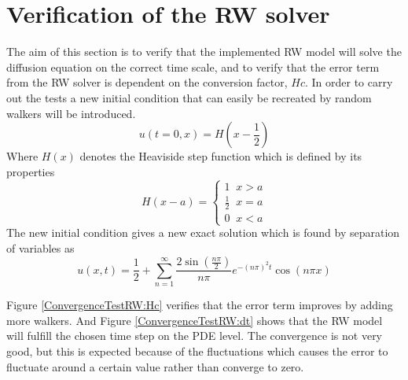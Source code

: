 \section{Verification of the RW solver}

The aim of this section is to verify that the implemented RW model will solve the diffusion equation on the correct time scale, and to verify that the error term from the RW solver is dependent on the conversion factor, $Hc$. 
In order to carry out the tests a new initial condition that can easily be recreated by random walkers will be introduced.
\begin{equation}
 u(t=0,x) = H\left(x-\frac{1}{2}\right)
\end{equation}
\noindent Where $H(x)$ denotes the Heaviside step function which is defined by its properties
\begin{equation}\label{Heaviside_def}
 H(x-a) = \begin{cases}
           1\;\;x > a\\
           \frac{1}{2}\;\; x = a\\ 
           0\;\;x < a
          \end{cases}
\end{equation}
\noindent The new initial condition gives a new exact solution which is found by separation of variables as 
\begin{equation}
 u(x,t) = \frac{1}{2} + \sum\limits_{n=1}^\infty \frac{2\sin(\frac{n\pi}{2})}{n\pi}e^{-(n\pi)^2t}\cos(n\pi x)
\end{equation}

\noindent Figure \ref{ConvergenceTestRW:Hc} verifies that the error term improves by adding more walkers. And Figure \ref{ConvergenceTestRW:dt} shows that the RW model will fulfill the chosen time step on the PDE level. 
The convergence is not very good, but this is expected because of the fluctuations which causes the error to fluctuate around a certain value rather than converge to zero.

